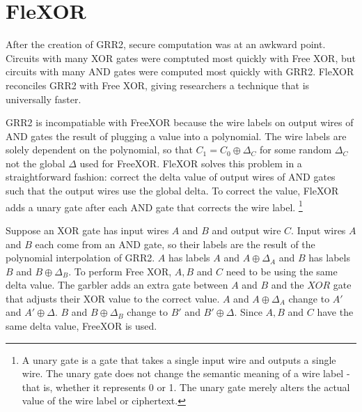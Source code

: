 
\section{FleXOR}
After the creation of GRR2, secure computation was at an awkward point.
Circuits with many XOR gates were comptuted most quickly with Free XOR, but circuits with many AND gates were computed most quickly with GRR2.
FleXOR reconciles GRR2 with Free XOR, giving researchers a technique that is universally faster.

GRR2 is incompatiable with FreeXOR because the wire labels on output wires of AND gates the result of plugging a value into a polynomial.
The wire labels are solely dependent on the polynomial, so that $C_1 = C_0 \oplus \Delta_C$ for some random $\Delta_C$ not the global $\Delta$ used for FreeXOR.
FleXOR solves this problem in a straightforward fashion: correct the delta value of output wires of AND gates such that the output wires use the global delta.
To correct the value, FleXOR adds a unary gate after each AND gate that corrects the wire label. \footnote{A unary gate is a gate that takes a single input wire and outputs a single wire. The unary gate does not change the semantic meaning of a wire label - that is, whether it represents 0 or 1. The unary gate merely alters the actual value of the wire label or ciphertext.}

Suppose an XOR gate has input wires $A$ and $B$ and output wire $C$.
Input wires $A$ and $B$ each come from an AND gate, so their labels are the result of the polynomial interpolation of GRR2.
$A$ has labels $A$ and $A \oplus \Delta_A$ and $B$ has labels $B$ and $B \oplus \Delta_B$.
To perform Free XOR, $A,B$ and $C$ need to be using the same delta value. 
The garbler adds an extra gate between $A$ and $B$ and the $XOR$ gate that adjusts their XOR value to the correct value.
$A$ and $A \oplus \Delta_A$ change to $A'$ and $A' \oplus \Delta$.
$B$ and $B \oplus \Delta_B$ change to $B'$ and $B' \oplus \Delta$.
Since $A, B$ and $C$ have the same delta value, FreeXOR is used.

